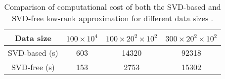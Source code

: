 %





\begin{table*}[h]
\caption{Comparison of computational cost of both the SVD-based and SVD-free low-rank approximation for different data sizes .}
    \begin{center}
     \begin{tabular}{|c|c|c|c|} 
	  \hline Data size & $100\times10^4$  &  $100\times20^2\times10^2$  &   $300\times20^2\times10^2$ \\ 
	  \hline SVD-based (s) & 603 & 14320 & 92318 \\
      	  \hline SVD-free (s) & 153 & 2753 & 15302	       		 \\ 
          \hline
    \end{tabular} 
   \end{center}
\label{tbl:time}
\end{table*}


%

